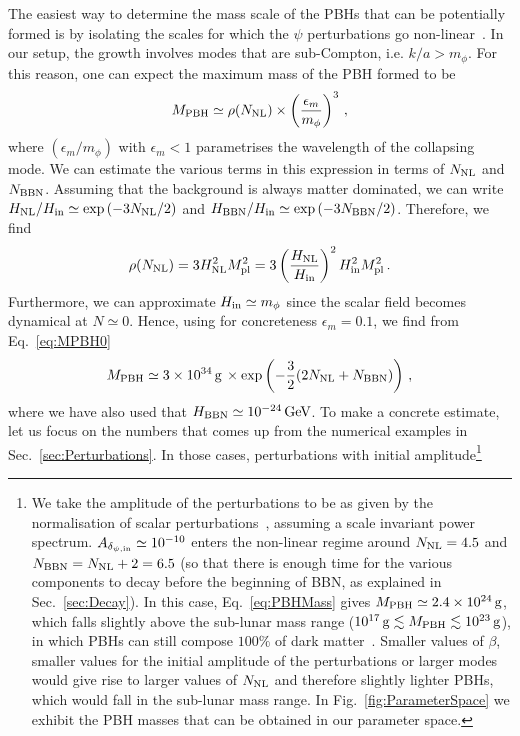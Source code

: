\documentclass[a4paper, amsfonts, amssymb, amsmath, reprint, showkeys, nofootinbib, twoside, superscriptaddress]{revtex4-1}
\def\mpl{M_{\rm pl}}
\def\mpl{M_{\rm pl}}
\begin{document}
The easiest way to determine the mass scale of the PBHs that can be potentially formed is by isolating the scales for which the $\psi$ perturbations go non-linear~\cite{Amendola:2017xhl, Georg:2016yxa, Georg:2017mqk}. In our setup, the growth involves modes that are sub-Compton, i.e. $k/a > m_\phi$. For this reason, one can expect the maximum mass of the PBH formed to be
\begin{equation}
M_{\rm PBH} \simeq \rho(N_{\rm NL}) \times \left(\frac{\epsilon_m}{m_\phi}\right)^3 \,,
\label{eq:MPBH0}
\end{equation}
where $(\epsilon_m/m_\phi)$ with $\epsilon_m < 1$ parametrises the wavelength of the collapsing mode. We can estimate the various terms in this expression in terms of $N_{\rm NL}$ and $N_{\rm BBN}$. Assuming that the background is always matter dominated, we can write $H_{\rm NL}/H_{\rm in} \simeq \exp\left(- 3 N_{\rm NL}/2\right)$ and $H_{\rm BBN}/H_{\rm in} \simeq \exp\left(- 3 N_{\rm BBN}/2\right)$. Therefore, we find
\begin{equation}
\rho({N_{\rm NL}}) = 3 H_{\rm NL}^2 \mpl^2 = 3 \left(\frac{H_{\rm NL}}{H_{\rm in}}\right)^2 H_{\rm in}^2 \mpl^2 \,.
\end{equation}
Furthermore, we can approximate $H_{\rm in} \simeq m_\phi$ since the scalar field becomes dynamical at $N \simeq 0$. Hence, using for concreteness $\epsilon_m = 0.1$, we find from Eq.~\eqref{eq:MPBH0}
\begin{equation}
\label{eq:PBHMass}
M_{\rm PBH} \simeq 3 \times 10^{34} \, \text{g} \, \times  \exp\left(-\frac{3}{2} (2 N_{\rm NL} + N_{\rm BBN})\right) \,,
\end{equation}
where we have also used that $H_{\rm BBN} \simeq 10^{-24} \, \text{GeV}$. To make a concrete estimate, let us focus on the numbers that comes up from the numerical examples in Sec.~\ref{sec:Perturbations}. In those cases, perturbations with initial amplitude\footnote{We take the amplitude of the perturbations to be as given by the normalisation of scalar perturbations~\cite{Planck:2018vyg}, assuming a scale invariant power spectrum. $A_{\delta_{\psi, \rm{in}}} \simeq 10^{-10}$ enters the non-linear regime around $N_{\rm NL} = 4.5$ and $N_{\rm BBN} = N_{\rm NL} + 2 = 6.5$ (so that there is enough time for the various components to decay before the beginning of BBN, as explained in Sec.~\ref{sec:Decay}). In this case, Eq.~\eqref{eq:PBHMass} gives $M_{\rm PBH} \simeq 2.4 \times 10^{24} \, \text{g}$, which falls slightly above the sub-lunar mass range ($10^{17} \, {\rm g} \lesssim M_{\rm PBH} \lesssim 10^{23} \, {\rm g}$), in which PBHs can still compose $100 \%$ of dark matter~\cite{Carr:2021bzv}. Smaller values of $\beta$, smaller values for the initial amplitude of the perturbations or larger modes would give rise to larger values of $N_{\rm NL}$ and therefore slightly lighter PBHs, which would fall in the sub-lunar mass range. In Fig.~\ref{fig:ParameterSpace} we exhibit the PBH masses that can be obtained in our parameter space.}
\end{document}
